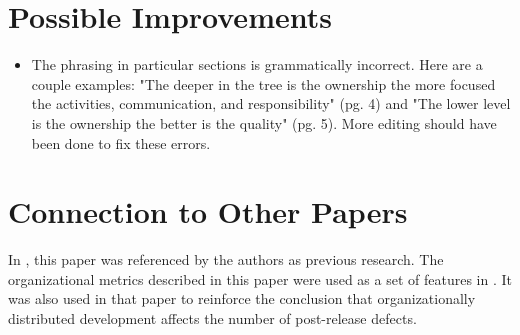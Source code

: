 \documentclass[english]{article}
\begin{document}
\section*{Possible Improvements}
\begin{itemize}
\item The phrasing in particular sections is grammatically incorrect. Here are a couple examples: "The deeper in the tree is the ownership the more focused the activities, communication, and responsibility" (pg. 4) and "The lower level is the ownership the better is the quality" (pg. 5). More editing should have been done to fix these errors.
\end{itemize}

\section*{Connection to Other Papers}

In \cite{bird09}, this paper was referenced by the authors as previous research.  The organizational metrics described in this paper were used as a set of features in \cite{bird09}. It was also used in that paper to reinforce the conclusion that organizationally distributed development affects the number of post-release defects.



\end{document}
